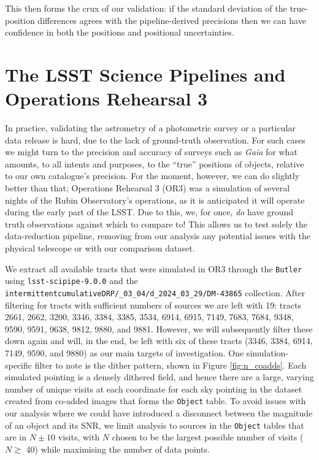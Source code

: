 \documentclass[SE,lsstdraft,authoryear,toc]{lsstdoc}
\begin{document}
This then forms the crux of our validation: if the standard deviation of the true-position differences agrees with the pipeline-derived precisions then we can have confidence in both the positions and positional uncertainties.

\section{The LSST Science Pipelines and Operations Rehearsal 3}
\label{sec:pipeline_or3}
In practice, validating the astrometry of a photometric survey or a particular data release is hard, due to the lack of ground-truth observation.
For such cases we might turn to the precision and accuracy of surveys such as \textit{Gaia} \citep{Collaboration2021} for what amounts, to all intents and purposes, to the ``true'' positions of objects, relative to our own catalogue's precision.
For the moment, however, we can do slightly better than that; Operations Rehearsal 3 (OR3) was a simulation of several nights of the Rubin Observatory's operations, as it is anticipated it will operate during the early part of the LSST.
Due to this, we, for once, \textit{do} have ground truth observations against which to compare to!
This allows us to test solely the data-reduction pipeline, removing from our analysis any potential issues with the physical telescope or with our comparison dataset.

We extract all available tracts that were simulated in OR3 through the \texttt{Butler} using \texttt{lsst-scipipe-9.0.0} and the \texttt{intermittentcumulativeDRP/\_03\_04/\allowbreak d\_2024\_03\_29/DM-43865} collection.
After filtering for tracts with sufficient numbers of sources we are left with 19: tracts 2661, 2662, 3200, 3346, 3384, 3385, 3534, 6914, 6915, 7149, 7683, 7684, 9348, 9590, 9591, 9638, 9812, 9880, and 9881.
However, we will subsequently filter these down again and will, in the end, be left with six of these tracts (3346, 3384, 6914, 7149, 9590, and 9880) as our main targets of investigation.
One simulation-specific filter to note is the dither pattern, shown in Figure \ref{fig:n_coadds}.
Each simulated pointing is a densely dithered field, and hence there are a large, varying number of unique visits at each coordinate for each sky pointing in the dataset created from co-added images that forms the \texttt{Object} table.
To avoid issues with our analysis where we could have introduced a disconnect between the magnitude of an object and its SNR, we limit analysis to sources in the \texttt{Object} tables that are in $N\pm10$ visits, with $N$ chosen to be the largest possible number of visits ($N \gtrsim$ 40) while maximising the number of data points.
\end{document}
